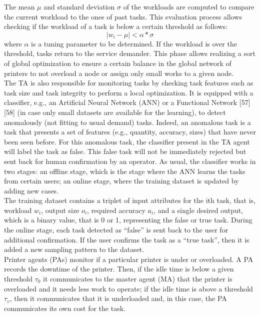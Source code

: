 The mean $\mu$ and standard deviation $\sigma$  of the workloads are computed to compare the current workload to the ones of past tasks. This evaluation process allows checking if the workload of a task is below a certain threshold as follows:
\begin{equation}
    \label{eq:10}
    |w_i - \mu| < \alpha * \sigma
\end{equation}
where $\alpha$ is a tuning parameter to be determined.
If the workload is over the threshold, tasks return to the service demander. This phase allows realizing a sort of global optimization to ensure a certain balance in the global network of printers to not overload a node or assign only small works to a given node.\\
The TA is also responsible for monitoring tasks by checking task features such as task size and task integrity to perform a local optimization. It is equipped with a classifier, e.g., an Artificial Neural Network (ANN) or a Functional Network [57] [58] (in case only small datasets are available for the learning), to detect anomalously (not fitting to usual demand) tasks. Indeed, an anomalous task is a task that presents a set of features (e.g., quantity, accuracy, sizes) that have never been seen before. For this anomalous task, the classifier present in the TA agent will label the task as false. This false task will not be immediately rejected but sent back for human confirmation by an operator. As usual, the classifier works in two stages: an offline stage, which is the stage where the ANN learns the tasks from certain users; an online stage, where the training dataset is updated by adding new cases.\\
The training dataset contains a triplet of input attributes for the ith task, that is, workload $w_i$, output size $o_i$, required accuracy $a_i$, and a single desired output, which is a binary value, that is 0 or 1, representing the false or true task. During the online stage, each task detected as “false” is sent back to the user for additional confirmation. If the user confirms the task as a “true task”, then it is added a new sampling pattern to the dataset.\\
Printer agents (PAs) monitor if a particular printer is under or overloaded. A PA records the downtime of the printer. Then, if the idle time is below a given threshold $\tau_0$ it communicates to the master agent (MA) that the printer is overloaded and it needs less work to operate; if the idle time is above a threshold $\tau_v$, then it communicates that it is underloaded and, in this case, the PA communicates its own cost for the task.\\
